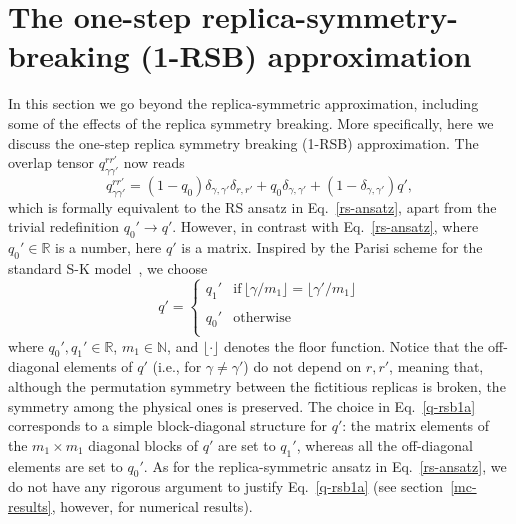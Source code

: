 \documentclass[twocolumn,superscriptaddress,prb,10pt]{revtex4-1}
\begin{document}
\section{The one-step replica-symmetry-breaking (1-RSB) approximation}
\label{rsb-1-section}

In this section we go beyond the replica-symmetric approximation, including some 
of the effects of the replica symmetry breaking. More specifically, 
here we discuss the one-step replica symmetry breaking (1-RSB) approximation. 
The overlap tensor $q_{\gamma\gamma'}^{rr'}$ now reads  
%
\begin{equation}
\label{q-rsb1}
q_{\gamma\gamma'}^{rr'}=(1-q_0)\delta_{\gamma,\gamma'}\delta_{r,r'} +
q_0\delta_{\gamma,\gamma'}+(1-\delta_{\gamma,\gamma'})q', 
\end{equation}
%
which is formally equivalent to the RS ansatz in Eq.~\eqref{rs-ansatz}, apart from 
the trivial redefinition $q_0'\to q'$. However, in contrast with Eq.~\eqref{rs-ansatz}, 
where $q_0'\in\mathbb{R}$ is a number, here $q'$ is a matrix. Inspired by the Parisi 
scheme for the standard S-K model~\cite{parisi-1979}, we choose 
%
\begin{equation}
q'=\left\{
\begin{array}{cc}
q_1' & \textrm{if}\, \lfloor\gamma/m_1\rfloor=\lfloor\gamma'/m_1\rfloor\\\\
q_0' & \textrm{otherwise}\\
\end{array}
\right.
\label{q-rsb1a}
\end{equation}
%
where $q_0',q_1'\in{\mathbb R}$, $m_1\in{\mathbb N}$, and $\lfloor\cdot\rfloor$ 
denotes the floor function. Notice that the off-diagonal elements of $q'$ (i.e., for 
$\gamma\ne\gamma'$) do not depend on $r,r'$, meaning that, although the permutation 
symmetry between the fictitious replicas is broken, the symmetry among the physical ones 
is preserved. The choice in Eq.~\eqref{q-rsb1a} corresponds to a simple block-diagonal 
structure for $q'$: the matrix elements of the $m_1\times m_1$ diagonal blocks of $q'$ 
are set to $q_1'$, whereas all the off-diagonal elements are set to $q_0'$. As for the 
replica-symmetric ansatz in Eq.~\eqref{rs-ansatz}, we do not have any rigorous argument 
to justify Eq.~\eqref{q-rsb1a} (see section~\eqref{mc-results}, however, for numerical 
results).
\end{document}
